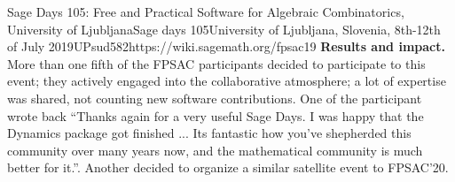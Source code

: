 \begin{event}{Sage Days 105: Free and Practical Software for Algebraic Combinatorics, University of Ljubljana}{Sage days 105}{University of Ljubljana, Slovenia,
8th-12th of July 2019}{UPsud}{58}{2}{https://wiki.sagemath.org/fpsac19}
\textbf{Results and impact.} More than one fifth of the FPSAC
participants decided to participate to this event; they actively
engaged into the collaborative atmosphere; a lot of expertise was
shared, not counting new software contributions. One of the
participant wrote back ``Thanks again for a very useful Sage Days. I
was happy that the Dynamics package got finished ... Its fantastic how
you’ve shepherded this community over many years now, and the
mathematical community is much better for it.''. Another decided to
organize a similar satellite event to FPSAC'20.

\end{event}
